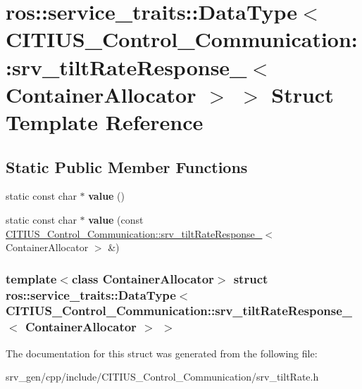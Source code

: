 \hypertarget{structros_1_1service__traits_1_1_data_type_3_01_c_i_t_i_u_s___control___communication_1_1srv__tie9a383ad38d1110401f7a6bac3b2af75}{\section{ros\-:\-:service\-\_\-traits\-:\-:\-Data\-Type$<$ \-C\-I\-T\-I\-U\-S\-\_\-\-Control\-\_\-\-Communication\-:\-:srv\-\_\-tilt\-Rate\-Response\-\_\-$<$ \-Container\-Allocator $>$ $>$ \-Struct \-Template \-Reference}
\label{structros_1_1service__traits_1_1_data_type_3_01_c_i_t_i_u_s___control___communication_1_1srv__tie9a383ad38d1110401f7a6bac3b2af75}
}
\subsection*{\-Static \-Public \-Member \-Functions}
\begin{DoxyCompactItemize}
\item 
\hypertarget{structros_1_1service__traits_1_1_data_type_3_01_c_i_t_i_u_s___control___communication_1_1srv__tie9a383ad38d1110401f7a6bac3b2af75_a5edb24ab14a2cf3671d2cd04b6ac28ab}{static const char $\ast$ {\bfseries value} ()}\label{structros_1_1service__traits_1_1_data_type_3_01_c_i_t_i_u_s___control___communication_1_1srv__tie9a383ad38d1110401f7a6bac3b2af75_a5edb24ab14a2cf3671d2cd04b6ac28ab}

\item 
\hypertarget{structros_1_1service__traits_1_1_data_type_3_01_c_i_t_i_u_s___control___communication_1_1srv__tie9a383ad38d1110401f7a6bac3b2af75_a6fe4242642216aab4b38b54791d39950}{static const char $\ast$ {\bfseries value} (const \hyperlink{struct_c_i_t_i_u_s___control___communication_1_1srv__tilt_rate_response__}{\-C\-I\-T\-I\-U\-S\-\_\-\-Control\-\_\-\-Communication\-::srv\-\_\-tilt\-Rate\-Response\-\_\-}$<$ \-Container\-Allocator $>$ \&)}\label{structros_1_1service__traits_1_1_data_type_3_01_c_i_t_i_u_s___control___communication_1_1srv__tie9a383ad38d1110401f7a6bac3b2af75_a6fe4242642216aab4b38b54791d39950}

\end{DoxyCompactItemize}
\subsubsection*{template$<$class Container\-Allocator$>$ struct ros\-::service\-\_\-traits\-::\-Data\-Type$<$ C\-I\-T\-I\-U\-S\-\_\-\-Control\-\_\-\-Communication\-::srv\-\_\-tilt\-Rate\-Response\-\_\-$<$ Container\-Allocator $>$ $>$}



\-The documentation for this struct was generated from the following file\-:\begin{DoxyCompactItemize}
\item 
srv\-\_\-gen/cpp/include/\-C\-I\-T\-I\-U\-S\-\_\-\-Control\-\_\-\-Communication/srv\-\_\-tilt\-Rate.\-h\end{DoxyCompactItemize}
